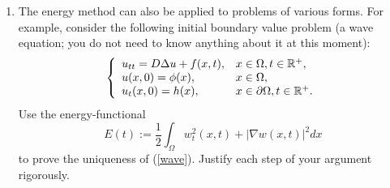 \documentclass[6pt]{article}
\numberwithin{equation}{section}
\def\mathbb{\Bbb}
\begin{document}
\begin{enumerate}
(i).  Use energy method to prove uniqueness to the following problem
\begin{equation}\label{decay}
\left\{
\begin{array}{ll}
u_t=D\Delta u-u,&x\in \Omega,t>0,\\
u(x,0)=\phi(x),&x\in \Omega,\\
u(x,t)=\psi(x,t),&x \in \partial \Omega, t>0.
\end{array}
\right.
\end{equation}

(ii).  Suppose that $f'$ is of one sign (you should determine what the sign it should be).  Prove uniqueness for following problem with $f=f(u)$ dependent only on $u$
\begin{equation}\label{nonlinear}
\left\{
\begin{array}{ll}
u_t=D\Delta u+f(u),&x\in \Omega,t>0,\\
u(x,0)=\phi(x),&x\in \Omega,\\
u(x,t)=\psi(x,t),&x \in \partial \Omega, t>0.
\end{array}
\right.
\end{equation}
For what conditions (on $f$) do you have the uniqueness of (\ref{nonlinear})?  Hint: according to intermediate value theorem, $f(u_1)-f(u_2)=f'(u_1+\theta (u_2-u_1))(u_1-u_2)$ for some $\theta\in[0,1]$.  Therefore you may work on the integral if $f'$ is of one sign.  Remark: you should see that it also works even if $f=f(x,t,u)$, while I skip $x$ and $t$ with loss of generality.

(iii)  (Only for motivated students) Assume that $f$ is Lipschitz continuous, i.e., there exists a positive constant $L$ such that $|f(u_1)-f(u_2)|\leq L |u_1-u_2|$ for any $u_1,u_2$.  Prove the uniqueness of \eqref{nonlinear}.  Hint: you may arrive at an ordinary differential inequality.  Solve that inequality. 

 

\vspace{0.2in}\item  
The energy method can also be applied to problems of various forms. For example, consider the following initial boundary value problem (a wave equation; you do not need to know anything about it at this moment):
\begin{equation}\label{wave}
\left\{
\begin{array}{ll}
u_{tt}=D\Delta u+f(x,t),&x\in \Omega,t\in\mathbb R^+,\\
u(x,0)=\phi(x),&x\in \Omega,\\
u_t(x,0)=h(x),&x \in \partial \Omega, t\in\mathbb R^+.
\end{array}
\right.
\end{equation}
Use the energy-functional
\[E(t):=\frac{1}{2}\int_\Omega w_t^2(x,t)+|\nabla w(x,t)|^2 dx\]
to prove the uniqueness of (\ref{wave}).  Justify each step of your argument rigorously.
 

 
 


\end{enumerate}
\end{document}
